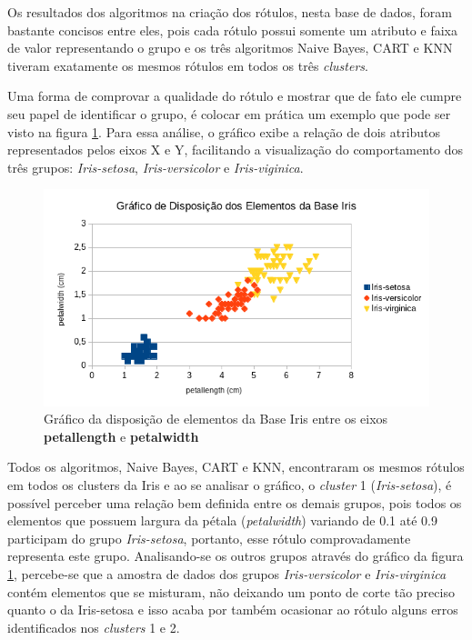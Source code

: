 Os resultados dos algoritmos na criação dos rótulos, nesta base de dados, foram bastante concisos entre eles, pois cada rótulo possui somente um atributo e faixa de valor representando o grupo e os três algoritmos Naive Bayes, CART e KNN tiveram exatamente os mesmos rótulos em todos os três \textit{clusters}. 

Uma forma de comprovar a qualidade do rótulo e mostrar que de fato ele cumpre seu papel de identificar o grupo, é colocar em prática um exemplo que pode ser visto na figura \ref{fig:grafico_iris_petalwidth_petallength_BrOf}. Para essa análise, o gráfico exibe a relação de dois atributos representados pelos eixos X e Y, facilitando a visualização do comportamento dos três grupos: \textit{Iris-setosa}, \textit{Iris-versicolor} e \textit{Iris-viginica}.

\begin{figure}[h!]
        \centering
        \includegraphics[scale=0.9]{figs/grafico_iris_petalwidth_petallength_BrOf.png}
        \caption{Gráfico da disposição de elementos da Base Iris entre os eixos \textbf{petallength} e \textbf{petalwidth}} \label{fig:grafico_iris_petalwidth_petallength_BrOf}
\end{figure}


Todos os algoritmos, Naive Bayes, CART e KNN, encontraram os mesmos rótulos em todos os clusters da Iris e ao se analisar o gráfico, o \textit{cluster} 1 (\textit{Iris-setosa}), é possível perceber uma relação bem definida entre os demais grupos, pois todos os elementos que possuem largura da pétala (\textit{petalwidth}) variando de 0.1 até 0.9 participam do grupo \textit{Iris-setosa}, portanto, esse rótulo comprovadamente representa este grupo. Analisando-se os outros grupos através do gráfico da figura \ref{fig:grafico_iris_petalwidth_petallength_BrOf}, percebe-se que a amostra de dados dos grupos \textit{Iris-versicolor} e \textit{Iris-virginica} contém elementos que se misturam, não deixando um ponto de corte tão preciso quanto o da Iris-setosa e isso acaba por também ocasionar ao rótulo alguns erros identificados nos \textit{clusters} 1 e 2. 
\newpage
